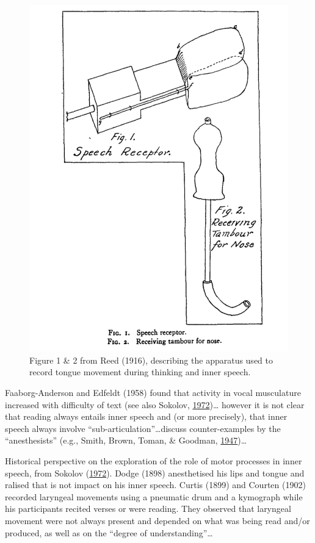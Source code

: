 \documentclass[a4paper,12pt,twoside,openright,oldfontcommands]{memoir}
\begin{document}
\begin{figure}[H]

{\centering \includegraphics[width=0.5\linewidth]{assets/reed} 

}

\caption{Figure 1 \& 2 from Reed (1916), describing the apparatus used to record tongue movement during thinking and inner speech.}\label{fig:reed}
\end{figure}

Faaborg-Anderson and Edfeldt (1958) found that activity in vocal musculature increased with difficulty of text (see also Sokolov, \protect\hyperlink{ref-sokolov_inner_1972}{1972})\ldots{} however it is not clear that reading always entails inner speech and (or more precisely), that inner speech always involve \enquote{sub-articulation}\ldots discuss counter-examples by the \enquote{anesthesists} (e.g., Smith, Brown, Toman, \& Goodman, \protect\hyperlink{ref-smith_lack_1947}{1947})\ldots{}

Historical perspective on the exploration of the role of motor processes in inner speech, from Sokolov (\protect\hyperlink{ref-sokolov_inner_1972}{1972}). Dodge (1898) anesthetised his lips and tongue and ralised that is not impact on his inner speech. Curtis (1899) and Courten (1902) recorded laryngeal movements using a pneumatic drum and a kymograph while his participants recited verses or were reading. They observed that laryngeal movement were not always present and depended on what was being read and/or produced, as well as on the \enquote{degree of understanding}\ldots{}
\end{document}
